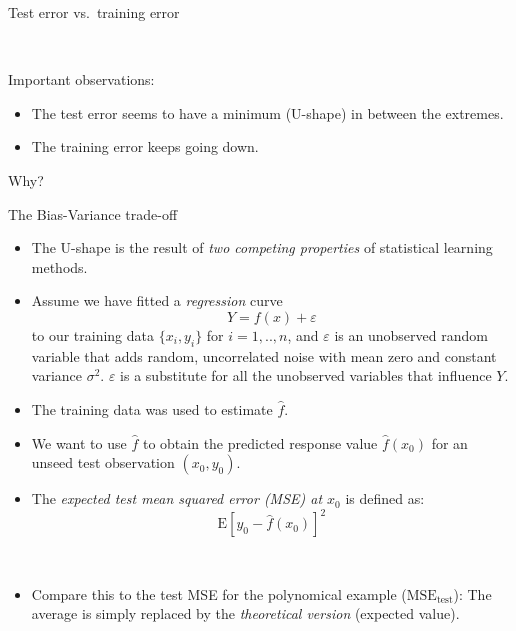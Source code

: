 \documentclass[ignorenonframetext,]{beamer}
\providecommand{\tightlist}{%
  \setlength{\itemsep}{0pt}\setlength{\parskip}{0pt}}
\begin{document}
\begin{frame}

\begin{block}{Test error vs.~training error}

\(~\)

Important observations:

\begin{itemize}
\item
  The test error seems to have a minimum (U-shape) in between the
  extremes.
\item
  The training error keeps going down.
\end{itemize}

\vspace{1.5cm} \centering
Why?

\end{block}

\end{frame}

\begin{frame}{The Bias-Variance trade-off}

\begin{itemize}
\item
  The U-shape is the result of \emph{two competing properties} of
  statistical learning methods.
\item
  Assume we have fitted a \emph{regression} curve
  \[Y  = f(x) + \varepsilon\] to our training data \(\{x_i, y_i\}\) for
  \(i=1,..,n\), and \(\varepsilon\) is an unobserved random variable
  that adds random, uncorrelated noise with mean zero and constant
  variance \(\sigma^2\). \(\varepsilon\) is a substitute for all the
  unobserved variables that influence \(Y\).
\item
  The training data was used to estimate \(\hat{f}\).
\end{itemize}

\end{frame}

\begin{frame}

\begin{itemize}
\item
  We want to use \(\hat{f}\) to obtain the predicted response value
  \(\hat{f}(x_0)\) for an unseed test observation \((x_0,y_0)\).
\item
  The \emph{expected test mean squared error (MSE) at \(x_0\)} is
  defined as: \[\text{E}[y_0 - \hat{f}(x_0)]^2\]
\end{itemize}

\(~\)

\begin{itemize}
\tightlist
\item
  Compare this to the test MSE for the polynomical example
  (\(\text{MSE}_{\text{test}}\)): The average is simply replaced by the
  \emph{theoretical version} (expected value).
\end{itemize}

\end{frame}
\end{document}

